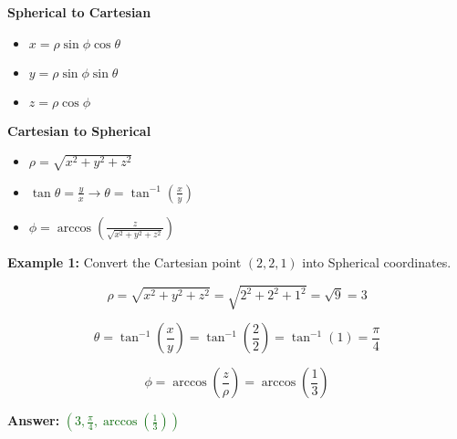 \documentclass[10pt]{article}                               %
\begin{document}
\begin{adjustwidth}{2em}{0pt}
\begin{adjustwidth}{2em}{0pt}
\begin{notebox}
        \end{notebox}

        \vspace{0.5em}

        \textbf{Spherical to Cartesian}

            \begin{itemize}
                \item \( x = \rho\sin\phi\cos\theta \)
                \item \( y = \rho\sin\phi\sin\theta \)
                \item \( z = \rho\cos\phi \)
            \end{itemize}

            \vspace{0.5em}

            \textbf{Cartesian to Spherical}

            \begin{itemize}
                \item \( \rho = \sqrt{x^2 + y^2 + z^2} \)
                \item \( \tan\theta = \frac{y}{x}  \rightarrow  \theta = \tan^{-1}\left(\frac{x}{y}\right) \)
                \item \( \phi = \arccos\left(\frac{z}{\sqrt{x^2 + y^2 + z^2}}\right) \)
            \end{itemize}

            \begin{examplebox}
        
                \textbf{Example 1:} Convert the Cartesian point \( \left(2,2,1\right) \) into Spherical coordinates.
                \vspace{0.5em}

                \begin{adjustwidth}{2em}{0pt}

                    \[ \rho = \sqrt{x^2 + y^2 + z^2} = \sqrt{2^2 + 2^2 + 1^2} = \sqrt{9} = 3 \]

                    \[ \theta = \tan^{-1}\left(\frac{x}{y}\right) = \tan^{-1}\left(\frac{2}{2}\right) = \tan^{-1}(1) = \frac{\pi}{4} \]

                    \[ \phi = \arccos\left(\frac{z}{\rho}\right) = \arccos\left(\frac{1}{3}\right) \]

                    \textbf{Answer:} \textcolor{darkgreen}{\( \left(3, \frac{\pi}{4}, \arccos\left(\frac{1}{3}\right)\right) \)}


\end{adjustwidth}
\end{examplebox}
\end{adjustwidth}
\end{adjustwidth}
\end{document}

